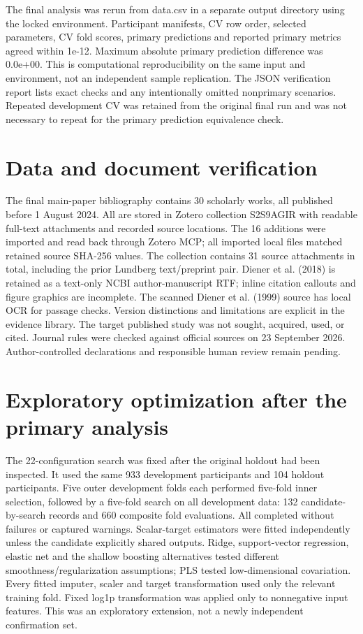 \documentclass[11pt,letterpaper]{article}
\begin{document}
The final analysis was rerun from data.csv in a separate output directory using the locked environment. Participant manifests, CV row order, selected parameters, CV fold scores, primary predictions and reported primary metrics agreed within 1e-12. Maximum absolute primary prediction difference was 0.0e+00. This is computational reproducibility on the same input and environment, not an independent sample replication. The JSON verification report lists exact checks and any intentionally omitted nonprimary scenarios. Repeated development CV was retained from the original final run and was not necessary to repeat for the primary prediction equivalence check.

\section{Data and document verification}\label{data-and-document-verification}

The final main-paper bibliography contains 30 scholarly works, all published before 1 August 2024. All are stored in Zotero collection S2S9AGIR with readable full-text attachments and recorded source locations. The 16 additions were imported and read back through Zotero MCP; all imported local files matched retained source SHA-256 values. The collection contains 31 source attachments in total, including the prior Lundberg text/preprint pair. Diener et al. (2018) is retained as a text-only NCBI author-manuscript RTF; inline citation callouts and figure graphics are incomplete. The scanned Diener et al. (1999) source has local OCR for passage checks. Version distinctions and limitations are explicit in the evidence library. The target published study was not sought, acquired, used, or cited. Journal rules were checked against official sources on 23 September 2026. Author-controlled declarations and responsible human review remain pending.

\section{Exploratory optimization after the primary analysis}\label{exploratory-optimization-after-the-primary-analysis}

The 22-configuration search was fixed after the original holdout had been inspected. It used the same 933 development participants and 104 holdout participants. Five outer development folds each performed five-fold inner selection, followed by a five-fold search on all development data: 132 candidate-by-search records and 660 composite fold evaluations. All completed without failures or captured warnings. Scalar-target estimators were fitted independently unless the candidate explicitly shared outputs. Ridge, support-vector regression, elastic net and the shallow boosting alternatives tested different smoothness/regularization assumptions; PLS tested low-dimensional covariation. Every fitted imputer, scaler and target transformation used only the relevant training fold. Fixed log1p transformation was applied only to nonnegative input features. This was an exploratory extension, not a newly independent confirmation set.
\end{document}
